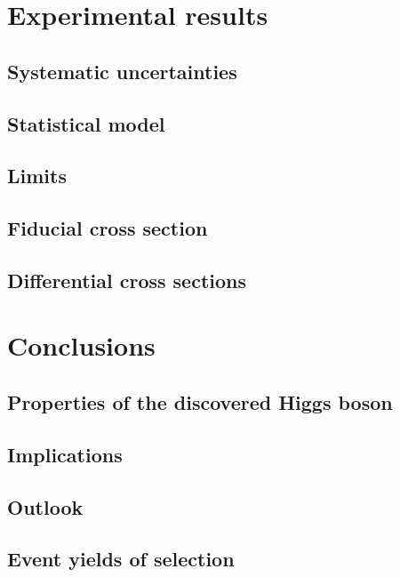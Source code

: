 \documentclass[hyper,linkcolor=blue]{mythesis}
\begin{document}
\begin{mainmatter}
  \chapter{Experimental results}
    \label{chap:results}
    
    \section{Systematic uncertainties}
      \label{sec:systematics}
      
    \section{Statistical model}
    \section{Limits}
    \section{Fiducial cross section}
      \label{sec:fiducial}
      
    \section{Differential cross sections}
      \label{sec:unfolding}
      

  \chapter{Conclusions}
    \label{chap:conclusions}
    
    \section{Properties of the discovered Higgs boson}
      \label{sec:searches}
      
    \section{Implications}
      \label{sec:implications}
      
    \section{Outlook}
      \label{sec:outlook}
      
\end{mainmatter}

\begin{appendices}
  \chapter{Event yields of \HWW selection}
    \label{app:sr_yields}
    
\end{appendices}

\begin{backmatter}
  
  
\end{backmatter}
\end{document}
